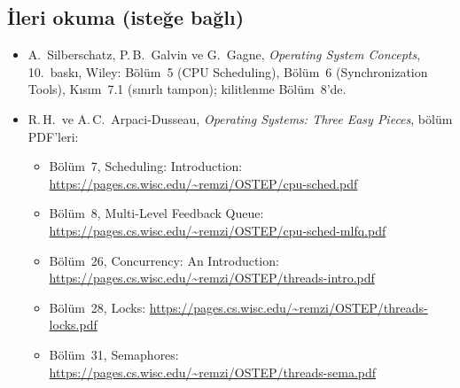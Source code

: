 \documentclass[11pt,a4paper]{article}
\begin{document}
\subsection*{İleri okuma (isteğe bağlı)}
{\small
\begin{itemize}[itemsep=0.1em]
  \item A.\ Silberschatz, P.\,B.\ Galvin ve G.\ Gagne, \emph{Operating System Concepts}, 10.\ baskı, Wiley: Bölüm~5 (CPU Scheduling), Bölüm~6 (Synchronization Tools), Kısım~7.1 (sınırlı tampon); kilitlenme Bölüm~8'de.
  \item R.\,H.\ ve A.\,C.\ Arpaci-Dusseau, \emph{Operating Systems: Three Easy Pieces}, bölüm PDF'leri:
  \begin{itemize}[itemsep=0em]
    \item Bölüm~7, Scheduling: Introduction: \url{https://pages.cs.wisc.edu/~remzi/OSTEP/cpu-sched.pdf}
    \item Bölüm~8, Multi-Level Feedback Queue: \url{https://pages.cs.wisc.edu/~remzi/OSTEP/cpu-sched-mlfq.pdf}
    \item Bölüm~26, Concurrency: An Introduction: \url{https://pages.cs.wisc.edu/~remzi/OSTEP/threads-intro.pdf}
    \item Bölüm~28, Locks: \url{https://pages.cs.wisc.edu/~remzi/OSTEP/threads-locks.pdf}
    \item Bölüm~31, Semaphores: \url{https://pages.cs.wisc.edu/~remzi/OSTEP/threads-sema.pdf}
  \end{itemize}
\end{itemize}}
\end{document}
